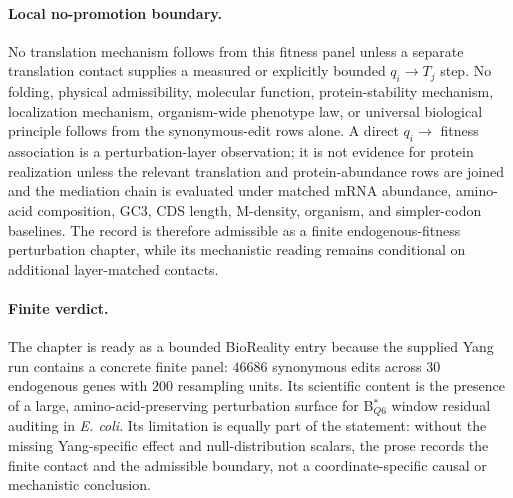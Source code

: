 \paragraph{Local no-promotion boundary.}
No translation mechanism follows from this fitness panel unless a separate translation contact supplies a measured or explicitly bounded $q_i \to T_j$ step.  No folding, physical admissibility, molecular function, protein-stability mechanism, localization mechanism, organism-wide phenotype law, or universal biological principle follows from the synonymous-edit rows alone.  A direct $q_i \to$ fitness association is a perturbation-layer observation; it is not evidence for protein realization unless the relevant translation and protein-abundance rows are joined and the mediation chain is evaluated under matched mRNA abundance, amino-acid composition, GC3, CDS length, M-density, organism, and simpler-codon baselines.  The record is therefore admissible as a finite endogenous-fitness perturbation chapter, while its mechanistic reading remains conditional on additional layer-matched contacts.

\paragraph{Finite verdict.}
The chapter is ready as a bounded BioReality entry because the supplied Yang run contains a concrete finite panel: $46686$ synonymous edits across $30$ endogenous genes with $200$ resampling units.  Its scientific content is the presence of a large, amino-acid-preserving perturbation surface for B$^{*}_{Q6}$ window residual auditing in \textit{E. coli}.  Its limitation is equally part of the statement: without the missing Yang-specific effect and null-distribution scalars, the prose records the finite contact and the admissible boundary, not a coordinate-specific causal or mechanistic conclusion.